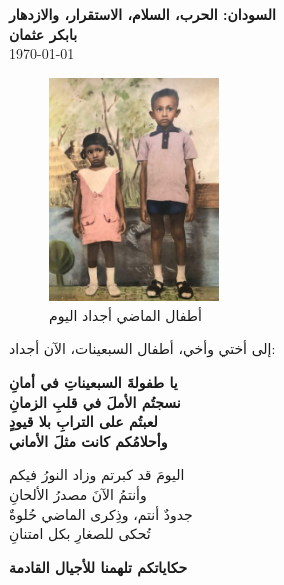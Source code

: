 \documentclass[12pt]{article}
\begin{document}
\begin{center}
    {\Huge\textbf{\textcolor{titleColor}{السودان: الحرب، السلام، الاستقرار، والازدهار}}} \\
    \vspace{0.5cm}
    \textbf{\textcolor{emphasisColor}{بابكر عثمان}} \\
    \vspace{0.2cm}
    \today
\end{center}

\begin{figure}
    \includegraphics[width=0.4\textwidth]{024.jpg}
    \caption{\textcolor{sectionColor}{أطفال الماضي أجداد اليوم}}
\end{figure}

\noindent
إلى أختي وأخي، أطفال السبعينات، الآن أجداد:

\begin{center}
\textbf{\textcolor{textHighlight}{
يا طفولةَ السبعيناتِ في أمانِ \\
نسجتُم الأملَ في قلبِ الزمانِ \\
لعبتُم على الترابِ بلا قيودٍ \\
وأحلامُكم كانت مثلَ الأماني \\
}} 
\end{center}

\vspace{0.5cm}

\noindent
\textcolor{sectionColor}{
اليومَ قد كبرتم وزاد النورُ فيكم \\
وأنتمُ الآنَ مصدرُ الألحانِ \\
جدودٌ أنتم، وذِكرى الماضي حُلوةٌ \\
تُحكى للصغارِ بكل امتنانِ \\
}

\vspace{1cm}
\centering
\textbf{\textcolor{emphasisColor}{حكاياتكم تلهمنا للأجيال القادمة}}
\end{document}

